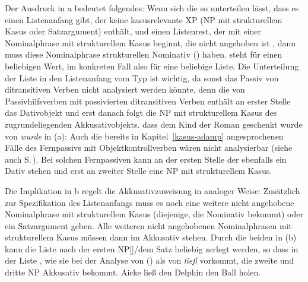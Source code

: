 {\noindent
Der Ausdruck in a bedeutet folgendes: Wenn sich die \argstl so unterteilen lässt, dass es einen
Listenanfang gibt, der keine kasusrelevante XP (NP mit strukturellem Kasus oder Satzargument) enthält, und einen Listenrest, der mit einer Nominalphrase mit strukturellem
Kasus beginnt, die nicht angehoben ist , dann muss diese Nominalphrase strukturellen
Nominativ () haben. \etag steht für einen beliebigen Wert, im konkreten Fall also für eine beliebige Liste.
Die Unterteilung der Liste  in den Listenanfang vom Typ 
ist wichtig, da sonst das Passiv von ditransitiven Verben nicht analysiert werden könnte, denn die
\argstl von Passivhilfsverben mit passivierten ditransitiven Verben enthält an erster Stelle das
Dativobjekt und erst danach folgt die NP mit strukturellem Kasus des zugrundeliegenden
Akkusativobjekts. 
\eal
\label{ex-dass dem Kind der Roman geschenkt wurde-Passiv}
\ex dass dem Kind der Roman geschenkt wurde
\ex \argst von \emph{wurde} in (a): 
\zl
Auch die bereits in Kapitel~\ref{kasus-adamp} angesprochenen Fälle des Fernpassivs
mit Objektkontrollverben wären nicht analysierbar (siehe auch S.\,\pageref{page-remote-passive-erlauben}). Bei solchen
Fernpassiven kann an der ersten Stelle der \argstl ebenfalls ein Dativ stehen und erst an zweiter Stelle eine
NP mit strukturellem Kasus.

Die Implikation in b regelt die Akkusativzuweisung in analoger Weise: Zusätzlich
zur Spezifikation des Listenanfangs muss es noch eine weitere nicht angehobene
Nominalphrase mit strukturellem Kasus (diejenige, die Nominativ bekommt) oder ein Satzargument geben. Alle weiteren
nicht angehobenen Nominalphrasen mit strukturellem Kasus  müssen dann im Akkusativ stehen.
Durch die beiden \etag in (b) kann die Liste nach der ersten NP[\str]/dem Satz beliebig zerlegt werden,
so dass \zb in der Liste , wie sie bei der Analyse von () als \argstl
von \emph{ließ} vorkommt, die zweite und dritte NP Akkusativ bekommt.
\ea
Aicke ließ den Delphin den Ball holen.
\z




}
